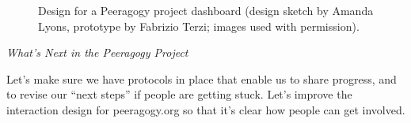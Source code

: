 
\begin{figure}[t]
{\centering
{}

\par}
\caption{Design for a Peeragogy project dashboard (design sketch by Amanda Lyons, prototype by Fabrizio Terzi; images used with permission).\label{dashboard}}
\end{figure}

\FloatBarrier

\begin{framed}
\noindent 
\emph{What's Next in the Peeragogy Project}
\begin{collectinmacro}{\WrapperWN}{}{}
Let's make sure we have protocols in place that enable us to share
progress, and to revise our ``next steps'' if people are getting
stuck.  Let's improve the interaction design for peeragogy.org so that
it's clear how people can get involved.
\end{collectinmacro}
\WrapperWN
\end{framed}    

\newpage
